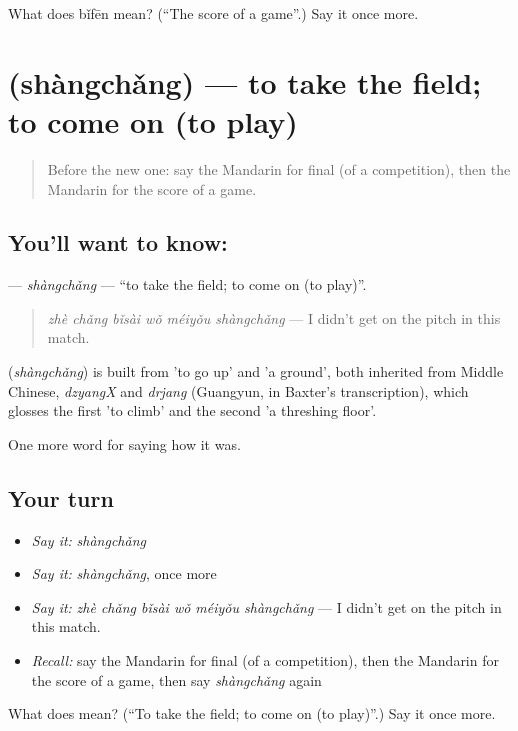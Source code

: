 \begin{tcolorbox}[breakable,colback=teal!4,colframe=teal!35!black,title={Before you move on}]
What does bǐfēn mean? (\textquotedblleft{}The score of a game\textquotedblright{}.) Say it once more.
\end{tcolorbox}
\section[\texorpdfstring{\zh{上场} (shàngchǎng)}{上场 (shàngchǎng)}]{ (shàngchǎng) — to take the field; to come on (to play)}

\label{lesson:ZH-C500-shangchang}



\begin{quote}
Before the new one: say the Mandarin for final (of a competition), then the Mandarin for the score of a game.
\end{quote}

\subsection*{You'll want to know: }
\textbf{} — \emph{shàngchǎng} — \textquotedblleft{}to take the field; to come on (to play)\textquotedblright{}.

\begin{quote}
\textbf{} \emph{zhè chǎng bǐsài wǒ méiyǒu shàngchǎng} — I didn't get on the pitch in this match.
\end{quote}

\begin{cousinweb}
\textbf{} (\emph{shàngchǎng}) is built from  'to go up' and  'a ground', both inherited from Middle Chinese, \emph{dzyangX} and \emph{drjang} (Guangyun, in Baxter's transcription), which glosses the first 'to climb' and the second 'a threshing floor'.
\end{cousinweb}

\begin{grammarlens}[title={What you've built}]
One more word for saying how it was.
\end{grammarlens}

\subsection*{Your turn}
\begin{itemize}
\raggedright
  \item \emph{Say it:} \emph{shàngchǎng}
  \item \emph{Say it:} \emph{shàngchǎng}, once more
  \item \emph{Say it:} \emph{zhè chǎng bǐsài wǒ méiyǒu shàngchǎng} — I didn't get on the pitch in this match.
  \item \emph{Recall:} say the Mandarin for final (of a competition), then the Mandarin for the score of a game, then say \emph{shàngchǎng} again
\end{itemize}

\begin{tcolorbox}[breakable,colback=teal!4,colframe=teal!35!black,title={Before you move on}]
What does  mean? (\textquotedblleft{}To take the field; to come on (to play)\textquotedblright{}.) Say it once more.
\end{tcolorbox}
